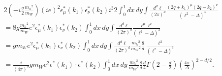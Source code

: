 \begin{align*}
  & 2 \left(-i \frac{g}{2} \frac{m_h{}^2}{m_W}\right) (ie)^2 \epsilon_\mu^\ast(k_1) \epsilon_\nu^\ast(k_2) i^3 2
  \int_0^1 dx\,dy \int \frac{d^d\ell}{(2\pi)^d} \frac{(2q+k_1)^\mu(2q-k_2)^\nu}{(\ell^2-\Delta)^3} \\
  &= 8g \frac{m_h{}^2}{m_W} e^2 \epsilon_\mu^\ast(k_1) \epsilon_\nu^\ast(k_2) \int_0^1 dx\,dy \int \frac{d^d\ell}{(2\pi)^d} \frac{\ell^\mu\ell^\nu}{(\ell^2-\Delta)^3} \\
  &= g m_W e^2 \epsilon_\mu^\ast(k_1) \epsilon_\nu^\ast(k_2) \int_0^1 dx\,dy \int \frac{d^d\ell}{(2\pi)^d}
  \frac{m_h{}^2}{m_W{}^2} \frac{8}{d} \frac{\ell^2}{(\ell^2-\Delta)^3} \\
  &= \frac{i}{(4\pi)^2} g m_W e^2 \epsilon^\ast(k_1) \cdot \epsilon^\ast(k_2) \int_0^1 dx\,dy\,
  \frac{m_h{}^2}{m_W{}^2} \frac{8}{d} \frac{d}{4} \Gamma\left(2-\frac{d}{2}\right) \left(\frac{4\pi}{\Delta}\right)^{2-d/2} .
\end{align*}

